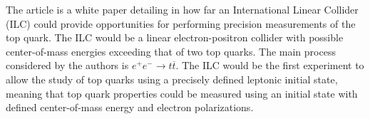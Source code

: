




The article\cite{ilc} is a white paper detailing in how far an International Linear Collider (ILC) could provide opportunities for performing precision measurements of the top quark.
The ILC would be a linear electron-positron collider with possible center-of-mass energies exceeding that of two top quarks.
The main process considered by the authors is $e^+e^-\to t\overline{t}$.
The ILC would be the first experiment to allow the study of top quarks using a precisely defined leptonic initial state, meaning that top quark properties could be measured using an initial state with defined center-of-mass energy and electron polarizations.


\nocite{*}
\printbibliography


